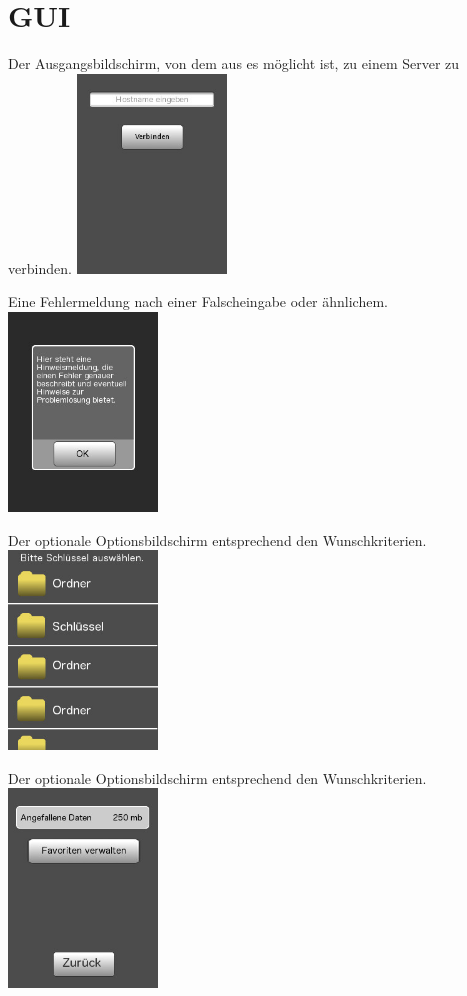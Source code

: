 \documentclass[a4paper,10pt]{scrartcl}
\begin{document}
\section{GUI}

\begin{illustration}{Der Ausgangsbildschirm, von dem aus es möglicht ist, zu einem Server zu verbinden.}
\includegraphics[width=150px]{figures/images/homescreen.jpg}
\end{illustration}
\begin{illustration}{Eine Fehlermeldung nach einer Falscheingabe oder ähnlichem.}
\includegraphics[width=150px]{figures/images/alert.jpg}
\end{illustration}
\begin{illustration}{Der optionale Optionsbildschirm entsprechend den Wunschkriterien.}
\includegraphics[width=150px]{figures/images/filebrowser.jpg}
\end{illustration}
\begin{illustration}{Der optionale Optionsbildschirm entsprechend den Wunschkriterien.}
\includegraphics[width=150px]{figures/images/optionscreen.jpg}
\end{illustration}
\end{document}
